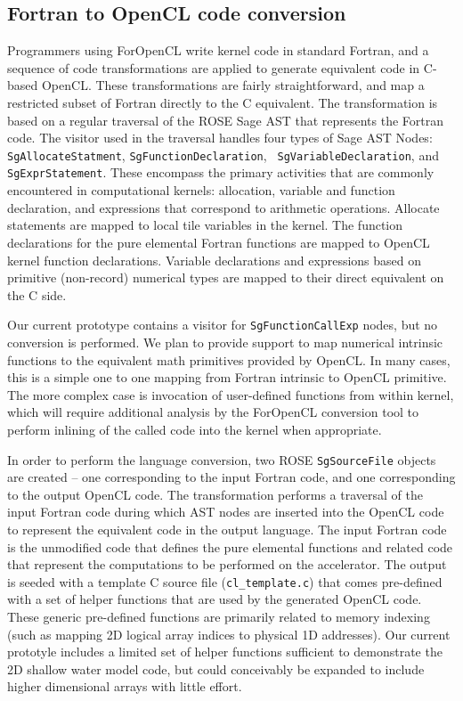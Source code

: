 \subsection{Fortran to OpenCL code conversion}

Programmers using ForOpenCL write kernel code in standard Fortran, and
a sequence of code transformations are applied to generate equivalent
code in C-based OpenCL.  These transformations are fairly
straightforward, and map a restricted subset of Fortran directly to
the C equivalent.  The transformation is based on a regular traversal
of the ROSE Sage AST that represents the Fortran code.  The visitor
used in the traversal handles four types of Sage AST Nodes: {\tt
  SgAllocateStatment}, {\tt SgFunctionDeclaration}, {\tt
  SgVariableDeclaration}, and {\tt SgExprStatement}.  These encompass
the primary activities that are commonly encountered in computational
kernels: allocation, variable and function declaration, and
expressions that correspond to arithmetic operations.  Allocate
statements are mapped to local tile variables in the kernel.  The
function declarations for the pure elemental Fortran functions are
mapped to OpenCL kernel function declarations.  Variable declarations and
expressions based on primitive (non-record) numerical types are mapped
to their direct equivalent on the C side.  

Our current prototype contains a visitor for {\tt SgFunctionCallExp}
nodes, but no conversion is performed.  We plan to provide support to
map numerical intrinsic functions to the equivalent math primitives
provided by OpenCL.  In many cases, this is a simple one to one
mapping from Fortran intrinsic to OpenCL primitive.  The more complex
case is invocation of user-defined functions from within kernel, which
will require additional analysis by the ForOpenCL conversion tool to
perform inlining of the called code into the kernel when appropriate.

In order to perform the language conversion, two ROSE {\tt SgSourceFile}
objects are created -- one corresponding to the input Fortran code, and
one corresponding to the output OpenCL code.  The transformation performs
a traversal of the input Fortran code during which AST nodes are inserted
into the OpenCL code to represent the equivalent code in the output language.
The input Fortran code is the unmodified code that defines the pure
elemental functions and related code that represent the computations to be
performed on the accelerator.  The output is seeded with a template C
source file ({\tt cl\_template.c}) that comes pre-defined with a set of
helper functions that are used by the generated OpenCL code.  These
generic pre-defined functions are primarily related to memory indexing (such
as mapping 2D logical array indices to physical 1D addresses).  Our current
prototyle includes a limited set of helper functions sufficient to demonstrate
the 2D shallow water model code, but could conceivably be expanded to include
higher dimensional arrays with little effort.
